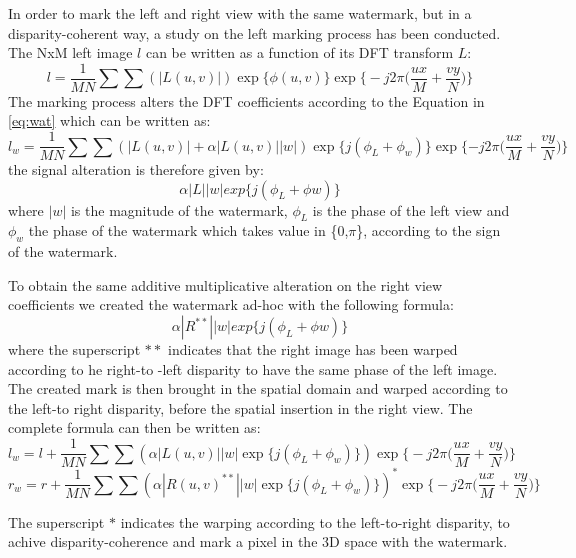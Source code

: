 In order to mark the left and right view with the same watermark, but in a disparity-coherent way, a study on the left marking process has been conducted.\\
The NxM left image $l$ can be written as a function of its DFT transform $L$:
$$ l =  \frac{1}{MN}\sum\sum(|L(u,v)|)\exp\{\phi (u,v)\} \exp\big\{-j2\pi\Big(\frac{ux}{M}+\frac{vy}{N}\Big)\big\}  $$
The marking process alters the DFT coefficients according to the Equation in \ref{eq:wat}
which can be written as:
$$ l_{w} = \frac{1}{MN}\sum\sum(|L(u,v)| + \alpha|L(u,v)||w|)\exp\big\{j(\phi_{L}+\phi_{w})\big\}\exp\{-j2\pi\Big(\frac{ux}{M}+\frac{vy}{N}\Big)\} $$
the signal alteration is therefore given by:
$$ \alpha|L||w|exp\{j(\phi_{L}+\phi{w})\} $$ 
where $|w|$ is the magnitude of the watermark, $\phi_{L}$ is the phase of the left view and $ \phi_{w}$ the phase of the watermark which takes value in \{0,$\pi$\}, according to the sign of the watermark.


To obtain the same additive multiplicative alteration on the right view coefficients we created the watermark ad-hoc with the following formula: 
$$ \alpha|R^{**}||w|exp\{j(\phi_{L}+\phi{w})\} $$ 
where the superscript $**$ indicates that the right image has been warped according to he right-to -left disparity to have the same phase of the left image.
The created mark is then brought in the spatial domain and warped according to the left-to right disparity, before the spatial insertion in the right view.
The complete formula can then be written as: 
$$ l_{w} = l + \frac{1}{MN}\sum\sum(\alpha|L(u,v)||w|\exp\{j(\phi_{L}+\phi_{w})\})\exp\big\{-j2\pi\Big(\frac{ux}{M}+\frac{vy}{N}\Big)\big\} $$
$$ r_{w} = r + \frac{1}{MN}\sum\sum(\alpha|R(u,v)^{**}||w|\exp\{j(\phi_{L}+\phi_{w})\})^{*}\exp\big\{-j2\pi\Big(\frac{ux}{M}+\frac{vy}{N}\Big)\big\} $$

The superscript $*$ indicates the warping according to the left-to-right disparity, to achive disparity-coherence and mark a pixel in the 3D space with the watermark.

